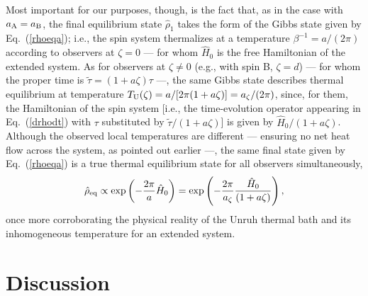 \documentclass[]{nature}
\begin{document}
{Most important for our purposes, though, is the fact that,
as in the case with $a_{\rm A}=a_{\rm B}$, 
the final equilibrium state $\hat\rho_1$ takes the form of  the Gibbs state given by Eq.~(\ref{rhoeqa});
i.e., the spin system thermalizes
at a temperature $\beta^{-1} = a/(2\pi)$ according to observers at $\zeta = 0$ --- for whom $\hat{H}_0$ is the free Hamiltonian of the extended system.
As for observers at $\zeta \neq 0$ (e.g.,  with spin B, $\zeta = d$) --- for whom the proper time is  $\tilde{\tau} = (1+a\zeta) \tau$ ---, 
the  same Gibbs state describes thermal equilibrium at temperature $T_{\rm U}({\zeta}) = 
a/[2 \pi(1+a\zeta)]=a_{\zeta}/(2\pi)$,
since, for them, the Hamiltonian of the spin system [i.e., the time-evolution operator appearing in Eq.~(\ref{drhodt}) with $\tau$ substituted by
$\tilde\tau/(1+a\zeta)$] is given by ${\hat H}_0/(1+a\zeta)$.
Although the observed local temperatures are different --- ensuring no net heat flow across the system, as pointed out earlier ---, the same final state 
given by Eq.~(\ref{rhoeqa}) is a true thermal 
equilibrium state for  all observers simultaneously, 
\begin{eqnarray} 
\hat{\rho}_{\rm eq} \propto {\rm exp}\left(-\frac{2\pi }{a}\hat{H}_0\right) = {\rm exp}\left(-\frac{2\pi}{a_\zeta}
\frac{ \hat{H}_0}{ (1+a\zeta)}\right),
\label{H0aH0zeta}
\end{eqnarray}
once more corroborating the physical reality of the Unruh thermal bath and its inhomogeneous temperature for an extended system. 






    
\section{Discussion}

}
\end{document}
